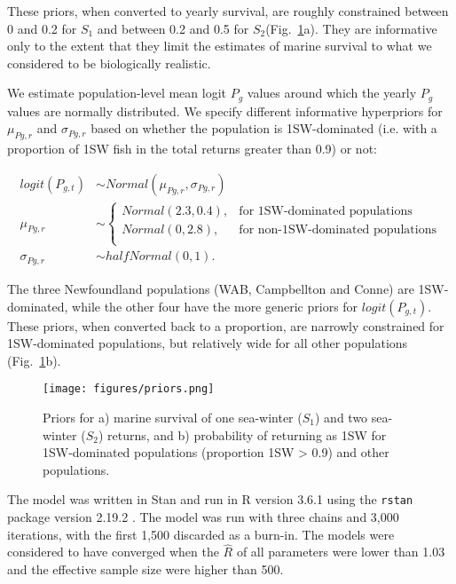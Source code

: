 \documentclass[12pt]{article}
\newcommand{\So}{$S_{1}$\xspace}
\newcommand{\St}{$S_{2}$\xspace}
\newcommand{\Pg}{$P_g$\xspace}
\newcommand{\prmu}{$\mu_{Pg,r}$\xspace}
\newcommand{\prsig}{$\sigma_{Pg,r}$\xspace}
\begin{document}
These priors, when converted to yearly survival, are roughly constrained between
0 and 0.2 for \So and between 0.2 and 0.5 for \St (Fig.~\ref{fig:priors}a). They are
informative only to the extent that they limit the estimates of marine survival
to what we considered to be biologically realistic.

We estimate population-level mean logit \Pg values around which the yearly \Pg
values are normally distributed. We specify different informative hyperpriors
for \prmu and \prsig based on whether the population is 1SW-dominated (i.e.
with a proportion of 1SW fish in the total returns greater than 0.9) or not:

\begin{align}
    logit(P_{g,t}) &\sim Normal(\mu_{Pg,r}, \sigma_{Pg,r}) \\
    \mu_{Pg,r} &\sim 
    \begin{cases}
       Normal(2.3, 0.4),  &\text{for 1SW-dominated populations} \\
       Normal(0, 2.8), &\text{for non-1SW-dominated populations} \\
   \end{cases} \\
    \sigma_{Pg,r} &\sim halfNormal(0, 1).
\end{align}

The three Newfoundland populations (WAB, Campbellton and Conne) are 
1SW-dominated, while the other four have the more generic priors for $logit(P_{g,t})$.
These priors, when converted back to a proportion, are narrowly constrained
for 1SW-dominated populations, but relatively wide for all other populations
(Fig.~\ref{fig:priors}b).

\begin{figure}[htbp] \centering
    \texttt{[image: figures/priors.png]} \caption{Priors
        for a) marine survival of one sea-winter (\So) and two sea-winter
        (\St) returns, and b) probability of returning as 1SW for
        1SW-dominated populations (proportion 1SW > 0.9) and other populations.}
    \label{fig:priors} 
\end{figure}


The model was written in Stan \citep{Carpenter2017} and run in R version 3.6.1
\citep{RCoreTeam2019} using the \texttt{rstan} package version 2.19.2
\citep{StanDevelopmentTeam2019}.
The model was run with three chains and 3,000 iterations, with the first 1,500
discarded as a burn-in. The models were considered to have converged when the
$\hat R$ of all parameters were lower than 1.03 and the effective sample size 
were higher than 500.
\end{document}
